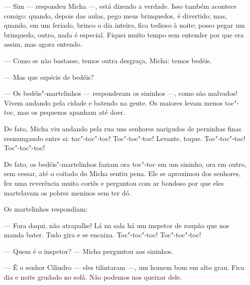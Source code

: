 --- Sim --- respondeu Micha ---, está dizendo a verdade. Isso também
acontece comigo: quando, depois das aulas, pego meus brinquedos, é
divertido; mas, quando, em um feriado, brinco o dia inteiro, fica
tedioso à noite; posso pegar um brinquedo, outro, nada é especial.
Fiquei muito tempo sem entender por que era assim, mas agora entendo.

--- Como se não bastasse, temos outra desgraça, Micha: temos bedéis.

--- Mas que espécie de bedéis?

--- Os bedéis"-martelinhos --- responderam os sininhos ---, como são
malvados! Vivem andando pela cidade e batendo na gente. Os maiores levam
menos toc"-toc, mas os pequenos apanham até doer.

De fato, Micha viu andando pela rua uns senhores narigudos de perninhas
finas resmungando entre si: toc"-toc"-toc! Toc"-toc"-toc! Levante, toque.
Toc"-toc"-toc! Toc"-toc"-toc!

De fato, os bedéis"-martelinhos faziam ora toc"-toc em um sininho, ora em
outro, sem cessar, até o coitado do Micha sentiu pena. Ele se aproximou
dos senhores, fez uma reverência muito cortês e perguntou com ar bondoso
por que eles martelavam os pobres meninos sem ter dó.

Os martelinhos respondiam:

--- Fora daqui, não atrapalhe! Lá na sala há um inspetor de roupão que
nos manda bater. Tudo gira e se encaixa. Toc"-toc"-toc! Toc"-toc"-toc!

--- Quem é o inspetor? --- Micha perguntou aos sininhos.

--- É o senhor Cilindro --- eles tilintaram ---, um homem bom em alto
grau. Fica dia e noite grudado no sofá. Não podemos nos queixar dele.

